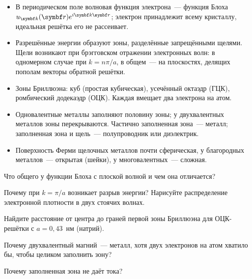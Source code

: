 \begin{itogi}
\begin{itemize}
\item В периодическом поле волновая функция электрона~— функция Блоха
$u_{\vb k}(\vb r)e^{i\vb k\vb r}$; электрон принадлежит всему кристаллу,
идеальная решётка его не рассеивает.
\item Разрешённые энергии образуют зоны, разделённые запрещёнными
щелями. Щели возникают при брэгговском отражении электронных волн:
в одномерном случае при $k=n\pi/a$, в общем~— на плоскостях, делящих
пополам векторы обратной решётки.
\item Зоны Бриллюэна: куб (простая кубическая), усечённый октаэдр (ГЦК),
ромбический додекаэдр (ОЦК). Каждая вмещает два электрона на атом.
\item Одновалентные металлы заполняют половину зоны; у двухвалентных
металлов зоны перекрываются. Частично заполненная зона~— металл;
заполненная зона и щель~— полупроводник или диэлектрик.
\item Поверхность Ферми щелочных металлов почти сферическая, у
благородных металлов~— открытая (шейки), у многовалентных~— сложная.
\end{itemize}
\end{itogi}

\begin{proverka}
\item Что общего у функции Блоха с плоской волной и чем она отличается?
\item Почему при $k=\pi/a$ возникает разрыв энергии? Нарисуйте
распределение электронной плотности в двух стоячих волнах.
\item Найдите расстояние от центра до граней первой зоны Бриллюэна для
ОЦК-решётки с $a=0{,}43$~нм (натрий).
\item Почему двухвалентный магний~— металл, хотя двух электронов на атом
хватило бы, чтобы целиком заполнить зону?
\item Почему заполненная зона не даёт тока?
\end{proverka}
